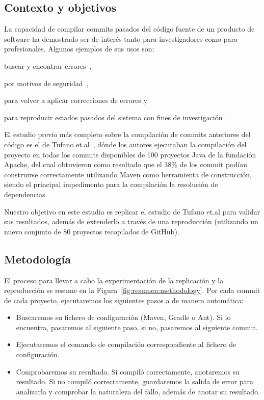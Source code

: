 \subsection{Contexto y objetivos}
La capacidad de compilar commits pasados del código fuente de un producto de software ha demostrado ser de interés tanto para investigadores como para profesionales. 
Algunos ejemplos de sus usos son: 
\begin{inparaenum}[\bf(1)]
    \item buscar y encontrar errores~\cite{Zimmermann:2006:MVA:1137983.1138001}, 
    \item por motivos de seguridad~\cite{deCarnedeCarnavalet:2014:CIV:2664243.2664288}, 
    \item para volver a aplicar correcciones de errores y~\cite{tian2017mining} 
    \item para reproducir estados pasados del sistema con fines de investigación~\cite{manacero2011using,Zimmermann2008}.
\end{inparaenum}

El estudio previo más completo sobre la compilación de commits anteriores del código es el de Tufano et.al~\cite{tufano2017there}, dónde los autores ejecutaban la compilación del proyecto en todas los commits disponibles de 100 proyectos Java de la fundación Apache, del cual obtuvieron como resultado que el 38\% de los commit podían construirse correctamente utilizando Maven como herramienta de construcción, siendo el principal impedimento para la compilación la resolución de dependencias.

Nuestro objetivo en este estudio es replicar el estudio de Tufano et.al para validar sus resultados, además de extenderlo a través de una reproducción (utilizando un nuevo conjunto de 80 proyectos recopilados de GitHub).

\subsection{Metodología}

El proceso para llevar a cabo la experimentación de la replicación y la reproducción se resume en la Figura~\ref{fig:resumen:methodology}.
Por cada commit de cada proyecto, ejecutaremos los siguientes pasos a de manera automática:
\begin{itemize}
    \item Buscaremos su fichero de configuración (Maven, Gradle o Ant). Si lo encuentra, pasaremos al siguiente paso, si no, pasaremos al siguiente commit.
    \item Ejecutaremos el comando de compilación correspondiente al fichero de configuración.
    \item Comprobaremos su resultado. Si compiló correctamente, anotaremos su resultado. Si no compiló correctamente, guardaremos la salida de error para analizarla y comprobar la naturaleza del fallo, además de anotar su resultado.
\end{itemize}

